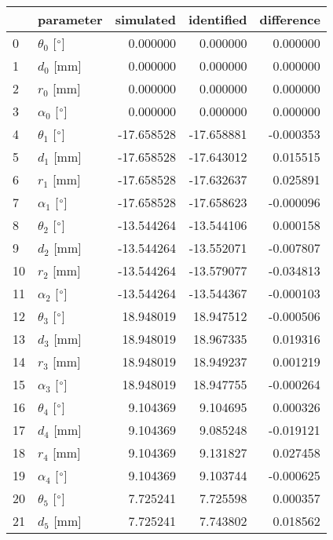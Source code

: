 \documentclass{standalone}%
\begin{document}
%
\normalsize%
\begin{tabular}{llrrr}
\toprule
{} &                 parameter &  simulated & identified & difference \\
\midrule
0  &  $\theta_{0}$ [$\degree$] &   0.000000 &   0.000000 &   0.000000 \\
1  &              $d_{0}$ [mm] &   0.000000 &   0.000000 &   0.000000 \\
2  &              $r_{0}$ [mm] &   0.000000 &   0.000000 &   0.000000 \\
3  &  $\alpha_{0}$ [$\degree$] &   0.000000 &   0.000000 &   0.000000 \\
4  &  $\theta_{1}$ [$\degree$] & -17.658528 & -17.658881 &  -0.000353 \\
5  &              $d_{1}$ [mm] & -17.658528 & -17.643012 &   0.015515 \\
6  &              $r_{1}$ [mm] & -17.658528 & -17.632637 &   0.025891 \\
7  &  $\alpha_{1}$ [$\degree$] & -17.658528 & -17.658623 &  -0.000096 \\
8  &  $\theta_{2}$ [$\degree$] & -13.544264 & -13.544106 &   0.000158 \\
9  &              $d_{2}$ [mm] & -13.544264 & -13.552071 &  -0.007807 \\
10 &              $r_{2}$ [mm] & -13.544264 & -13.579077 &  -0.034813 \\
11 &  $\alpha_{2}$ [$\degree$] & -13.544264 & -13.544367 &  -0.000103 \\
12 &  $\theta_{3}$ [$\degree$] &  18.948019 &  18.947512 &  -0.000506 \\
13 &              $d_{3}$ [mm] &  18.948019 &  18.967335 &   0.019316 \\
14 &              $r_{3}$ [mm] &  18.948019 &  18.949237 &   0.001219 \\
15 &  $\alpha_{3}$ [$\degree$] &  18.948019 &  18.947755 &  -0.000264 \\
16 &  $\theta_{4}$ [$\degree$] &   9.104369 &   9.104695 &   0.000326 \\
17 &              $d_{4}$ [mm] &   9.104369 &   9.085248 &  -0.019121 \\
18 &              $r_{4}$ [mm] &   9.104369 &   9.131827 &   0.027458 \\
19 &  $\alpha_{4}$ [$\degree$] &   9.104369 &   9.103744 &  -0.000625 \\
20 &  $\theta_{5}$ [$\degree$] &   7.725241 &   7.725598 &   0.000357 \\
21 &              $d_{5}$ [mm] &   7.725241 &   7.743802 &   0.018562 \\

\end{tabular}
\end{document}
